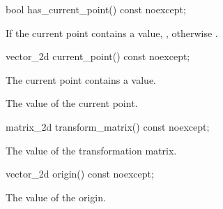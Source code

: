\begin{itemdecl}
    bool has_current_point() const noexcept;
\end{itemdecl}
\begin{itemdescr}
	\pnum
	\returns
	If the current point contains a value, , otherwise .
\end{itemdescr}

\begin{itemdecl}
    vector_2d current_point() const noexcept;
\end{itemdecl}
\begin{itemdescr}
	\pnum
	\requires
	The current point contains a value.
	
	\pnum
	\returns
	The value of the current point.
\end{itemdescr}

\begin{itemdecl}
    matrix_2d transform_matrix() const noexcept;
\end{itemdecl}
\begin{itemdescr}
	\pnum
	\returns
	The value of the transformation matrix.
\end{itemdescr}

\begin{itemdecl}
    vector_2d origin() const noexcept;
\end{itemdecl}
\begin{itemdescr}
	\pnum
	\returns
	The value of the origin.
\end{itemdescr}
